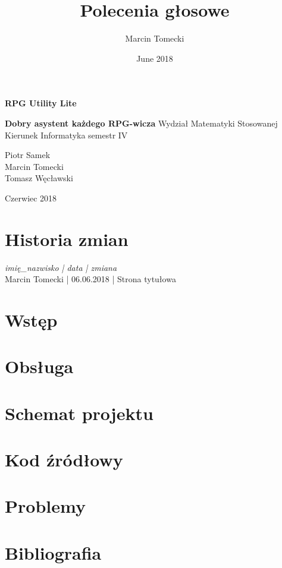 \documentclass{article}
\title{Polecenia głosowe}
\author{Marcin Tomecki}
\date{June 2018}
\begin{document}
\begin{titlepage}
\centering
\Huge \textbf{RPG Utility Lite}\par
\Large \textbf{Dobry asystent każdego RPG-wicza}
\vfill
Wydział Matematyki Stosowanej\\Kierunek Informatyka semestr IV\par
\vfill
\vfill
\begin{flushright}
Piotr Samek\\
Marcin Tomecki\\
Tomasz Węcławski
\end{flushright}
Czerwiec 2018
\end{titlepage}
\tableofcontents
\newpage
\clearpage
\section{Historia zmian}
\textit{imię\_nazwisko | data | zmiana}\\
Marcin Tomecki | 06.06.2018 | Strona tytułowa

\section{Wstęp}

\section{Obsługa}

\section{Schemat projektu}

\section{Kod źródłowy}

\section{Problemy}

\section{Bibliografia}
\end{document}
